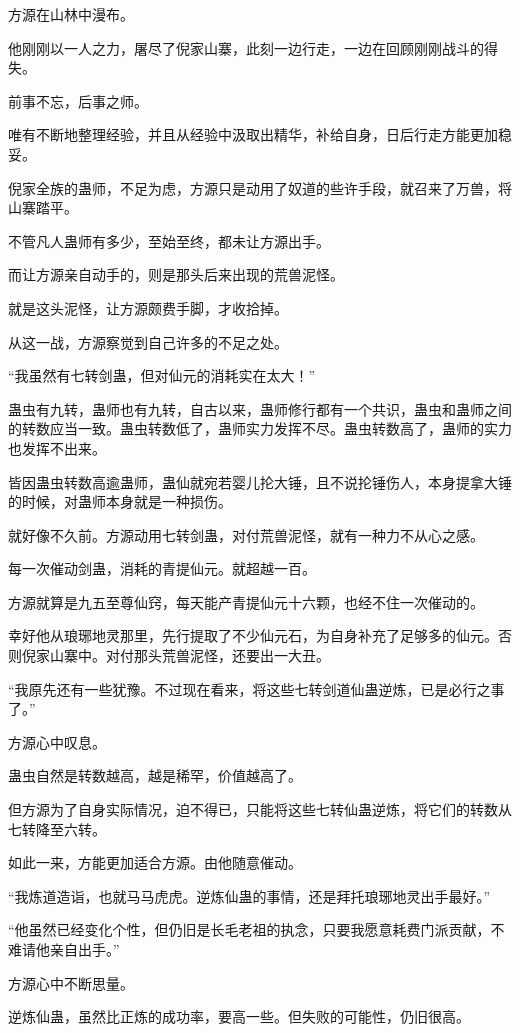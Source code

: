 \begin{this_body}
方源在山林中漫布。

他刚刚以一人之力，屠尽了倪家山寨，此刻一边行走，一边在回顾刚刚战斗的得失。

前事不忘，后事之师。

唯有不断地整理经验，并且从经验中汲取出精华，补给自身，日后行走方能更加稳妥。

倪家全族的蛊师，不足为虑，方源只是动用了奴道的些许手段，就召来了万兽，将山寨踏平。

不管凡人蛊师有多少，至始至终，都未让方源出手。

而让方源亲自动手的，则是那头后来出现的荒兽泥怪。

就是这头泥怪，让方源颇费手脚，才收拾掉。

从这一战，方源察觉到自己许多的不足之处。

“我虽然有七转剑蛊，但对仙元的消耗实在太大！”

蛊虫有九转，蛊师也有九转，自古以来，蛊师修行都有一个共识，蛊虫和蛊师之间的转数应当一致。蛊虫转数低了，蛊师实力发挥不尽。蛊虫转数高了，蛊师的实力也发挥不出来。

皆因蛊虫转数高逾蛊师，蛊仙就宛若婴儿抡大锤，且不说抡锤伤人，本身提拿大锤的时候，对蛊师本身就是一种损伤。

就好像不久前。方源动用七转剑蛊，对付荒兽泥怪，就有一种力不从心之感。

每一次催动剑蛊，消耗的青提仙元。就超越一百。

方源就算是九五至尊仙窍，每天能产青提仙元十六颗，也经不住一次催动的。

幸好他从琅琊地灵那里，先行提取了不少仙元石，为自身补充了足够多的仙元。否则倪家山寨中。对付那头荒兽泥怪，还要出一大丑。

“我原先还有一些犹豫。不过现在看来，将这些七转剑道仙蛊逆炼，已是必行之事了。”

方源心中叹息。

蛊虫自然是转数越高，越是稀罕，价值越高了。

但方源为了自身实际情况，迫不得已，只能将这些七转仙蛊逆炼，将它们的转数从七转降至六转。

如此一来，方能更加适合方源。由他随意催动。

“我炼道造诣，也就马马虎虎。逆炼仙蛊的事情，还是拜托琅琊地灵出手最好。”

“他虽然已经变化个性，但仍旧是长毛老祖的执念，只要我愿意耗费门派贡献，不难请他亲自出手。”

方源心中不断思量。

逆炼仙蛊，虽然比正炼的成功率，要高一些。但失败的可能性，仍旧很高。


\end{this_body}
